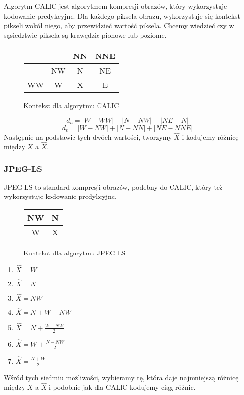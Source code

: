 \documentclass{../notatki}
\begin{document}
Algorytm CALIC jest algorytmem kompresji obrazów, który wykorzystuje
kodowanie predykcyjne. Dla każdego piksela obrazu, wykorzystuje się kontekst
pikseli wokół niego, aby przewidzieć wartość piksela. Chcemy wiedzieć czy w
sąsiedztwie piksela są krawędzie pionowe lub poziome.
\begin{figure*}[h]
  \centering
  \begin{tabular}{|c|c|c|c|}
    \hline
    & & NN & NNE \\
    \hline
    & NW & N & NE \\
    \hline
    WW & W & \color{red} X & E \\
    \hline
  \end{tabular}
  \caption{Kontekst dla algorytmu CALIC}
\end{figure*}
$$
d_h = |W - WW| + |N - NW| + |NE - N|
$$
$$
d_v = |W - NW| + |N - NN| + |NE - NNE|
$$
Następnie na podstawie tych dwóch wartości, tworzymy $\widehat{X}$ i kodujemy
różnicę między $X$ a $\widehat{X}$.

\subsubsection{JPEG-LS}

JPEG-LS to standard kompresji obrazów, podobny do CALIC, który też wykorzystuje
kodowanie predykcyjne.
\begin{figure*}[h]
  \centering
  \begin{tabular}{|c|c|}
    \hline
    NW & N \\
    \hline
    W & \color{red} X \\
    \hline
  \end{tabular}
  \caption{Kontekst dla algorytmu JPEG-LS}
\end{figure*}
\begin{enumerate}
  \item $\widehat{X} = W$
  \item $\widehat{X} = N$
  \item $\widehat{X} = NW$
  \item $\widehat{X} = N + W - NW$
  \item $\widehat{X} = N + \frac{W - NW}{2}$
  \item $\widehat{X} = W + \frac{N - NW}{2}$
  \item $\widehat{X} = \frac{N + W}{2}$
\end{enumerate}
Wśród tych siedmiu możliwości, wybieramy tę, która daje najmniejszą różnicę
między $X$ a $\widehat{X}$ i podobnie jak dla CALIC kodujemy ciąg różnic.
\end{document}

